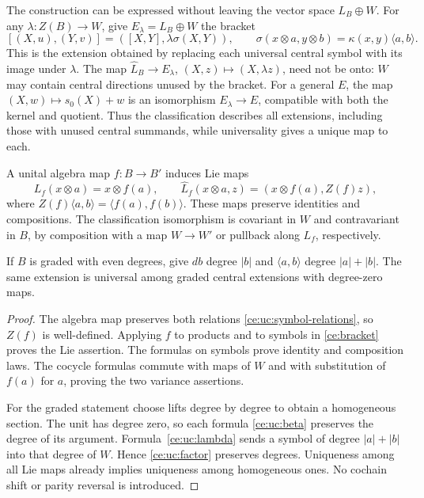 The construction can be expressed without leaving the vector space
$L_B\oplus W$.  For any $\lambda:Z(B)\to W$, give
$E_\lambda=L_B\oplus W$ the bracket
\[
 [(X,u),(Y,v)]=([X,Y],\lambda\sigma(X,Y)),\qquad
 \sigma(x\otimes a,y\otimes b)=\kappa(x,y)\langle a,b\rangle.
\]
This is the extension obtained by replacing each universal central
symbol with its image under $\lambda$.  The map
$\widehat L_B\to E_\lambda$, $(X,z)\mapsto(X,\lambda z)$, need not
be onto: $W$ may contain central directions unused by the bracket.
For a general $E$, the map $(X,w)\mapsto s_0(X)+w$ is an isomorphism
$E_\lambda\to E$, compatible with both the kernel and quotient.
Thus the classification describes all extensions, including those with
unused central summands, while universality gives a unique map to each.

\begin{proposition}
\label{ce:uc:functor}
A unital algebra map $f:B\to B'$ induces Lie maps
\[
 L_f(x\otimes a)=x\otimes f(a),\qquad
 \widehat L_f(x\otimes a,z)
  =(x\otimes f(a),Z(f)z),
\]
where $Z(f)\langle a,b\rangle=\langle f(a),f(b)\rangle$.
These maps preserve identities and compositions.  The classification
isomorphism is covariant in $W$ and contravariant in $B$, by composition
with a map $W\to W'$ or pullback along $L_f$, respectively.

If $B$ is graded with even degrees, give $db$ degree $|b|$ and
$\langle a,b\rangle$ degree $|a|+|b|$.  The same extension is universal
among graded central extensions with degree-zero maps.
\end{proposition}

\begin{proof}
The algebra map preserves both relations \eqref{ce:uc:symbol-relations},
so $Z(f)$ is well-defined.  Applying $f$ to products and to symbols in
\eqref{ce:bracket} proves the Lie assertion.  The formulas on
symbols prove identity and composition laws.  The cocycle formulas
commute with maps of $W$ and with substitution of $f(a)$ for $a$,
proving the two variance assertions.

For the graded statement choose lifts degree by degree to obtain a
homogeneous section.  The unit has degree zero, so each formula
\eqref{ce:uc:beta} preserves the degree of its argument.
Formula~\eqref{ce:uc:lambda} sends a symbol of degree $|a|+|b|$ into
that degree of $W$.  Hence \eqref{ce:uc:factor} preserves degrees.
Uniqueness among all Lie maps already implies uniqueness among
homogeneous ones.  No cochain shift or parity reversal is introduced.
\end{proof}

